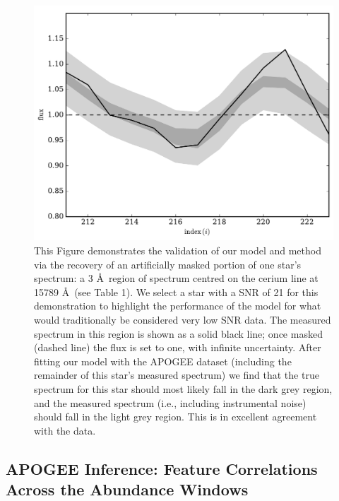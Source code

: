 \documentclass[a4paper,fleqn,usenatbib]{mnras}
\begin{document}
\begin{figure}
	\includegraphics[width=\columnwidth]{apogee_centers_final_29502_spc_iw_prior_rec_test_win_wid_1p5_recovery_zoom.pdf}
    \caption{This Figure demonstrates the validation of our model and method via the recovery of an artificially masked portion of one star's spectrum: a 3 \AA\ region of spectrum centred on the cerium line at 15789 \AA\ (see Table 1). We select a star with a SNR of 21 for this demonstration to highlight the performance of the model for what would traditionally be considered very low SNR data. The measured spectrum in this region is shown as a solid black line; once masked (dashed line) the flux is set to one, with infinite uncertainty. After fitting our model with the APOGEE dataset (including the remainder of this star's measured spectrum) we find that the true spectrum for this star should most likely fall in the dark grey region, and the measured spectrum (i.e., including instrumental noise) should fall in the light grey region. This is in excellent agreement with the data.}
    \label{fig:recovery_test}
\end{figure}

\subsection{APOGEE Inference: Feature Correlations Across the Abundance Windows}
\label{sec:inference}
\end{document}
